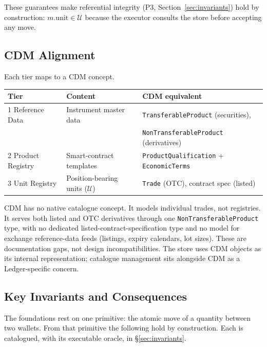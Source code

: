 These guarantees make referential integrity (P3, Section~\ref{sec:invariants}) hold by construction: $m.\text{unit} \in \mathcal{U}$ because the executor consults the store before accepting any move.

\subsection{CDM Alignment}

Each tier maps to a CDM concept.

\begin{center}
\small
\begin{tabular}{lll}
\toprule
\textbf{Tier} & \textbf{Content} & \textbf{CDM equivalent} \\
\midrule
1 Reference Data & Instrument master data & \texttt{TransferableProduct} (securities), \\
 & & \texttt{NonTransferableProduct} (derivatives) \\
2 Product Registry & Smart-contract templates & \texttt{ProductQualification} + \texttt{EconomicTerms} \\
3 Unit Registry & Position-bearing units ($\mathcal{U}$) & \texttt{Trade} (OTC), contract spec (listed) \\
\bottomrule
\end{tabular}
\end{center}

CDM has no native catalogue concept. It models individual trades, not registries. It serves both listed and OTC derivatives through one \texttt{NonTransferableProduct} type, with no dedicated listed-contract-specification type and no model for exchange reference-data feeds (listings, expiry calendars, lot sizes). These are documentation gaps, not design incompatibilities. The store uses CDM objects as its internal representation; catalogue management sits alongside CDM as a Ledger-specific concern.

\subsection*{Key Invariants and Consequences}

The foundations rest on one primitive: the atomic move of a quantity between two
wallets. From that primitive the following hold by construction. Each is catalogued, with
its executable oracle, in \S\ref{sec:invariants}.

